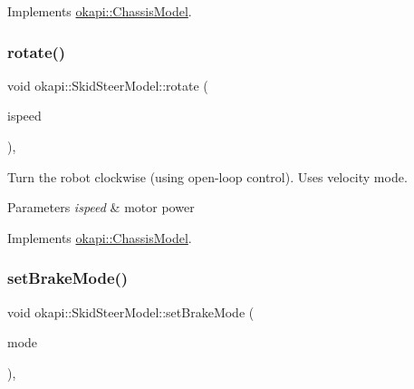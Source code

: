 Implements \mbox{\hyperlink{classokapi_1_1ChassisModel_a282fcf947aea9630cadd2c673eb5f7e3}{okapi\+::\+Chassis\+Model}}.

\mbox{\label{classokapi_1_1SkidSteerModel_af02dab85c80cf8aa226b33a39851feff}} 
\subsubsection{\texorpdfstring{rotate()}{rotate()}}
{\footnotesize\ttfamily void okapi\+::\+Skid\+Steer\+Model\+::rotate (\begin{DoxyParamCaption}\item[{double}]{ispeed }\end{DoxyParamCaption})\hspace{0.3cm}{\ttfamily [override]}, {\ttfamily [virtual]}}

Turn the robot clockwise (using open-\/loop control). Uses velocity mode.


\begin{DoxyParams}{Parameters}
{\em ispeed} & motor power \\
\hline
\end{DoxyParams}


Implements \mbox{\hyperlink{classokapi_1_1ChassisModel_af13aa5281c762eb61a444f0b35176014}{okapi\+::\+Chassis\+Model}}.

\mbox{\label{classokapi_1_1SkidSteerModel_a84c100815058f4dcdc958b3349713f73}} 
\subsubsection{\texorpdfstring{setBrakeMode()}{setBrakeMode()}}
{\footnotesize\ttfamily void okapi\+::\+Skid\+Steer\+Model\+::set\+Brake\+Mode (\begin{DoxyParamCaption}\item[{\mbox{\hyperlink{classokapi_1_1AbstractMotor_a132e0485dbb59a60c3f934338d8fa601}{Abstract\+Motor\+::brake\+Mode}}}]{mode }\end{DoxyParamCaption})\hspace{0.3cm}{\ttfamily [override]}, {\ttfamily [virtual]}}

